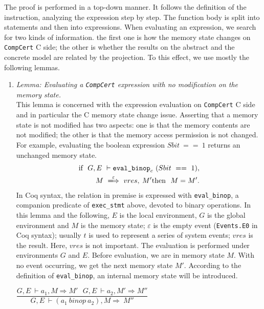 \documentclass[twocolumn]{article}
\newcommand{\compcert}{\texttt{CompCert}\xspace}
\begin{document}
The proof is performed in a top-down manner. It follows the definition
of the instruction, analyzing the expression step by step.  The
function body is split into statements and then into expressions.
When evaluating an expression, we search for two kinds of information.
the first one is how the memory state changes on \compcert C side; the other is
whether the results on the abstract and the concrete model are related
by the projection. To this effect, we use mostly the following lemmas.

\begin{enumerate}
\item
  \textit{Lemma: Evaluating a \compcert expression with no modification on the memory state.}\\
  This lemma is concerned with the expression evaluation on \compcert
  C side and in particular the C memory state change issue.  Asserting
  that a memory state is not modified has two aspects: one is that the
  memory contents are not modified; the other is that the memory
  access permission is not changed.  For example, evaluating the
  boolean expression $Sbit~==~1$ returns an unchanged memory state.
\begin{align*}
\textrm{if}~~ G,E~\vdash \texttt{eval\_binop}_c~(Sbit~==~1),\\
\:M~\xLongrightarrow{\varepsilon}~vres,\:M'
\textrm{then}~~ M=M'.
\end{align*}
In Coq syntax, the relation in premise is expressed with
\texttt{eval\_binop}, a companion predicate of \texttt{exec\_stmt}
above, devoted to binary operations.  In this lemma and the following,
$E$ is the local environment, $G$ is the global environment and $M$ is
the memory state; $\varepsilon$ is the empty event (\texttt{Events.E0}
in Coq syntax); usually $t$ is used to represent a series of system
events; $vres$ is the result.  Here, $vres$ is not important.  The
evaluation is performed under environments $G$ and $E$.  Before
evaluation, we are in memory state $M$.  With no event occurring, we
get the next memory state $M'$. According to the definition of
\texttt{eval\_binop}, an internal memory state will be introduced.
\begin{center}
$\dfrac
{G,E~\vdash a_1,M\Rightarrow M'~~~G,E~\vdash a_2,M'\Rightarrow M''
}
{G,E~\vdash (a_1~binop~a_2),M\Rightarrow~M''}$
\end{center}


\end{enumerate}
\end{document}
